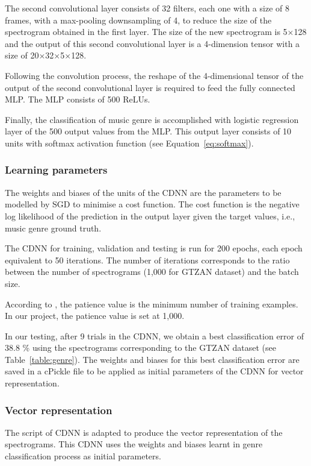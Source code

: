 The second convolutional layer consists of 32 filters, each one with a size of 8 frames, with a max-pooling downsampling of 4, to reduce the size of the spectrogram obtained in the first layer. The size of the new spectrogram is 5$\times$128 and the output of this second convolutional layer is a 4-dimension tensor with a size of 20$\times$32$\times$5$\times$128.

Following the convolution process, the reshape of the 4-dimensional tensor of the output of the second convolutional layer is required to feed the fully connected MLP. The MLP consists of 500 ReLUs.

Finally, the classification of music genre is accomplished with logistic regression layer of the 500 output values from the MLP. This output layer consists of 10 units with softmax activation function (see Equation~\eqref{eq:softmax}).

\subsubsection{Learning parameters}
The weights and biases of the units of the CDNN are the parameters
to be modelled by SGD to minimise a cost function. The cost function is the negative log likelihood of the prediction in the output layer given the target values, i.e., music genre ground truth.

The CDNN for training, validation and testing is run for 200 epochs, each epoch equivalent to 50 iterations. The number of iterations corresponds to the ratio between the number of spectrograms (1,000 for GTZAN dataset) and the batch size.

According to \textcite{bengio2012practical}, the patience value is the minimum number of training examples. In our project, the patience value is set at 1,000.

In our testing, after 9 trials in the CDNN, we obtain a best classification error of 38.8 \% using the spectrograms corresponding to the GTZAN dataset (see Table~\ref{table:genre}). The weights and biases for this best classification error are saved in a cPickle file to be applied as initial parameters of the CDNN for vector representation.

\subsubsection{Vector representation}
The script of CDNN is adapted to produce the vector representation of the spectrograms. This CDNN uses the weights and biases learnt in genre classification process as initial parameters.

